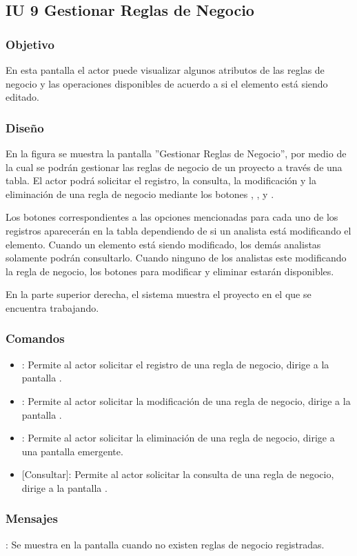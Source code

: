 \subsection{IU 9 Gestionar Reglas de Negocio}

\subsubsection{Objetivo}
	En esta pantalla el actor puede visualizar algunos atributos de las reglas de negocio y las operaciones disponibles de acuerdo a si el elemento está siendo editado.
\subsubsection{Diseño}
	En la figura  se muestra la pantalla ''Gestionar Reglas de Negocio'', por medio de la cual se podrán gestionar las reglas de negocio de un proyecto a través de una tabla. El actor podrá solicitar el registro, la consulta, la modificación y la eliminación de una regla de negocio mediante los botones , , \editar y \eliminar.
	
	Los botones correspondientes a las opciones mencionadas para cada uno de los registros aparecerán en la tabla dependiendo de si un analista está modificando el elemento. Cuando un elemento está siendo modificado, los demás analistas solamente podrán consultarlo. Cuando ninguno de los analistas este modificando la regla de negocio, los botones para modificar y eliminar estarán disponibles.
	
	En la parte superior derecha, el sistema muestra el proyecto en el que se encuentra trabajando.

\subsubsection{Comandos}
\begin{itemize}
	\item {}: Permite al actor solicitar el registro de una regla de negocio, dirige a la pantalla .
	\item \editar [Modificar]: Permite al actor solicitar la modificación de una regla de negocio, dirige a la pantalla .
	\item \eliminar [Eliminar]: Permite al actor solicitar la eliminación de una regla de negocio, dirige a una pantalla emergente.
	\item {} [Consultar]: Permite al actor solicitar la consulta de una regla de negocio, dirige a la pantalla  .
\end{itemize}
\subsubsection{Mensajes}

\begin{Citemize}
	\item {}: Se muestra en la pantalla  cuando no existen reglas de negocio registradas.
\end{Citemize}
